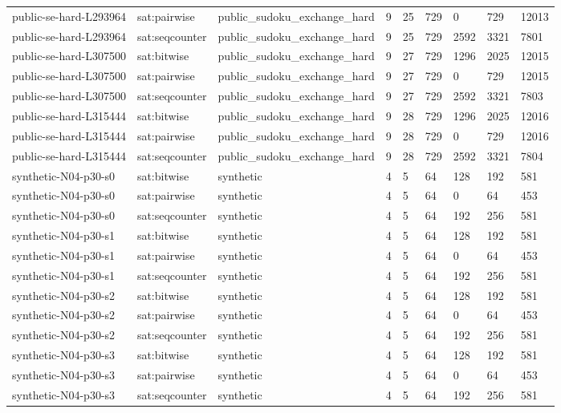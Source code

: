 \begin{tabular}{lllllllll}
public-se-hard-L293964 & sat:pairwise & public\_sudoku\_exchange\_hard & 9 & 25 & 729 & 0 & 729 & 12013 \\
public-se-hard-L293964 & sat:seqcounter & public\_sudoku\_exchange\_hard & 9 & 25 & 729 & 2592 & 3321 & 7801 \\
public-se-hard-L307500 & sat:bitwise & public\_sudoku\_exchange\_hard & 9 & 27 & 729 & 1296 & 2025 & 12015 \\
public-se-hard-L307500 & sat:pairwise & public\_sudoku\_exchange\_hard & 9 & 27 & 729 & 0 & 729 & 12015 \\
public-se-hard-L307500 & sat:seqcounter & public\_sudoku\_exchange\_hard & 9 & 27 & 729 & 2592 & 3321 & 7803 \\
public-se-hard-L315444 & sat:bitwise & public\_sudoku\_exchange\_hard & 9 & 28 & 729 & 1296 & 2025 & 12016 \\
public-se-hard-L315444 & sat:pairwise & public\_sudoku\_exchange\_hard & 9 & 28 & 729 & 0 & 729 & 12016 \\
public-se-hard-L315444 & sat:seqcounter & public\_sudoku\_exchange\_hard & 9 & 28 & 729 & 2592 & 3321 & 7804 \\
synthetic-N04-p30-s0 & sat:bitwise & synthetic & 4 & 5 & 64 & 128 & 192 & 581 \\
synthetic-N04-p30-s0 & sat:pairwise & synthetic & 4 & 5 & 64 & 0 & 64 & 453 \\
synthetic-N04-p30-s0 & sat:seqcounter & synthetic & 4 & 5 & 64 & 192 & 256 & 581 \\
synthetic-N04-p30-s1 & sat:bitwise & synthetic & 4 & 5 & 64 & 128 & 192 & 581 \\
synthetic-N04-p30-s1 & sat:pairwise & synthetic & 4 & 5 & 64 & 0 & 64 & 453 \\
synthetic-N04-p30-s1 & sat:seqcounter & synthetic & 4 & 5 & 64 & 192 & 256 & 581 \\
synthetic-N04-p30-s2 & sat:bitwise & synthetic & 4 & 5 & 64 & 128 & 192 & 581 \\
synthetic-N04-p30-s2 & sat:pairwise & synthetic & 4 & 5 & 64 & 0 & 64 & 453 \\
synthetic-N04-p30-s2 & sat:seqcounter & synthetic & 4 & 5 & 64 & 192 & 256 & 581 \\
synthetic-N04-p30-s3 & sat:bitwise & synthetic & 4 & 5 & 64 & 128 & 192 & 581 \\
synthetic-N04-p30-s3 & sat:pairwise & synthetic & 4 & 5 & 64 & 0 & 64 & 453 \\
synthetic-N04-p30-s3 & sat:seqcounter & synthetic & 4 & 5 & 64 & 192 & 256 & 581 \\

\end{tabular}
